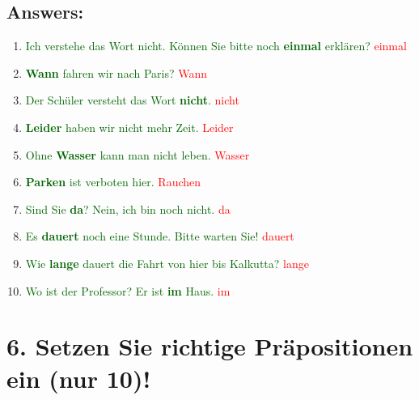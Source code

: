 \documentclass[12pt]{article}
\begin{document}
\subsection*{Answers:}
\begin{enumerate}
    \item \textcolor{darkgreen}{Ich verstehe das Wort nicht. Können Sie bitte noch \textbf{einmal} erklären?} \textcolor{red}{einmal}
    \item \textcolor{darkgreen}{\textbf{Wann} fahren wir nach Paris?} \textcolor{red}{Wann}
    \item \textcolor{darkgreen}{Der Schüler versteht das Wort\textbf{ nicht}.} \textcolor{red}{nicht}
    \item \textcolor{darkgreen}{\textbf{Leider} haben wir nicht mehr Zeit.} \textcolor{red}{Leider}
    \item \textcolor{darkgreen}{Ohne \textbf{Wasser} kann man nicht leben.} \textcolor{red}{Wasser}
    \item \textcolor{darkgreen}{\textbf{Parken} ist verboten hier.} \textcolor{red}{Rauchen}
    \item \textcolor{darkgreen}{Sind Sie \textbf{da}? Nein, ich bin noch nicht.} \textcolor{red}{da}
    \item \textcolor{darkgreen}{Es\textbf{ dauert} noch eine Stunde. Bitte warten Sie!} \textcolor{red}{dauert}
    \item \textcolor{darkgreen}{Wie\textbf{ lange} dauert die Fahrt von hier bis Kalkutta?} \textcolor{red}{lange}
    \item \textcolor{darkgreen}{Wo ist der Professor? Er ist \textbf{im} Haus.} \textcolor{red}{im}
\end{enumerate}


\vspace{1em}

\section*{6. Setzen Sie richtige Präpositionen ein (nur 10)!}
\end{document}
